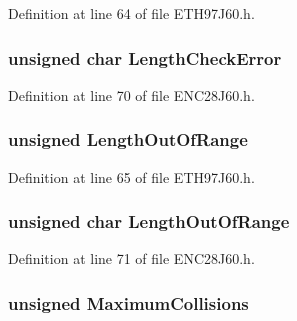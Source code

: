 Definition at line 64 of file E\+T\+H97\+J60.\+h.

\hypertarget{union_t_x_s_t_a_t_u_s_a6100c4d76ea1b4110a4e6efffa431e65}{}
\subsubsection[{Length\+Check\+Error}]{\setlength{\rightskip}{0pt plus 5cm}unsigned char Length\+Check\+Error}\label{union_t_x_s_t_a_t_u_s_a6100c4d76ea1b4110a4e6efffa431e65}


Definition at line 70 of file E\+N\+C28\+J60.\+h.

\hypertarget{union_t_x_s_t_a_t_u_s_a4287a36b8a1daf1f41c7ee9a2d1fbae2}{}
\subsubsection[{Length\+Out\+Of\+Range}]{\setlength{\rightskip}{0pt plus 5cm}unsigned Length\+Out\+Of\+Range}\label{union_t_x_s_t_a_t_u_s_a4287a36b8a1daf1f41c7ee9a2d1fbae2}


Definition at line 65 of file E\+T\+H97\+J60.\+h.

\hypertarget{union_t_x_s_t_a_t_u_s_a390dd13a1eb0ef079f6dd40e0f12759e}{}
\subsubsection[{Length\+Out\+Of\+Range}]{\setlength{\rightskip}{0pt plus 5cm}unsigned char Length\+Out\+Of\+Range}\label{union_t_x_s_t_a_t_u_s_a390dd13a1eb0ef079f6dd40e0f12759e}


Definition at line 71 of file E\+N\+C28\+J60.\+h.

\hypertarget{union_t_x_s_t_a_t_u_s_a57b1b20232da52035200a3bae196b1a9}{}
\subsubsection[{Maximum\+Collisions}]{\setlength{\rightskip}{0pt plus 5cm}unsigned Maximum\+Collisions}\label{union_t_x_s_t_a_t_u_s_a57b1b20232da52035200a3bae196b1a9}


